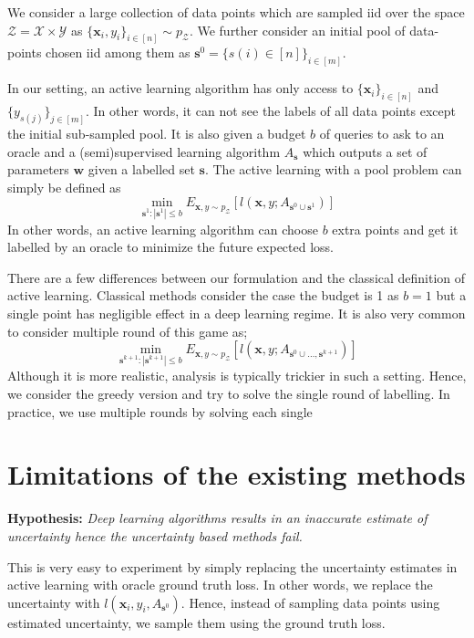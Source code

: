 \documentclass{article}
\begin{document}
We consider a large collection of data points which are sampled iid over the space  $\mathcal{Z}=\mathcal{X}\times\mathcal{Y}$ as \mbox{$\{\mathbf{x}_i,y_i\}_{i \in [n]} \sim p_\mathcal{Z}$}. We further consider an initial pool of data-points chosen iid among them as \mbox{$\mathbf{s}^0=\{s(i) \in [n]\}_{i \in [m]}$}. 

In our setting, an active learning algorithm has only access to $\{\mathbf{x}_i\}_{i \in [n]}$ and $\{y_{s(j)}\}_{j \in [m] }$. In other words, it can not see the labels of all data points except the initial sub-sampled pool. It is also given a budget $b$ of queries to ask to an oracle and a (semi)supervised learning algorithm $A_{\mathbf{s}}$ which outputs a set of parameters $\mathbf{w}$ given a labelled set $\mathbf{s}$. The active learning with a pool problem can simply be defined as
\begin{equation}
\min_{\mathbf{s}^1 : |\mathbf{s}^1| \leq b} E_{\mathbf{x},y \sim p_\mathcal{Z}} [l(\mathbf{x},y; A_{\mathbf{s}^0 \cup \mathbf{s}^1})]
\end{equation}
In other words, an active learning algorithm can choose $b$ extra points and get it labelled by an oracle to minimize the future expected loss.

There are a few differences between our formulation and the classical definition of active learning. Classical methods consider the case the budget is 1 as $b=1$ but a single point has negligible effect in a deep learning regime. It is also very common to consider multiple round of this game as;
\begin{equation}
\min_{\mathbf{s}^{k+1} : |\mathbf{s}^{k+1}| \leq b} E_{\mathbf{x},y \sim p_\mathcal{Z}} [l(\mathbf{x},y; A_{\mathbf{s}^{0} \cup \ldots, \mathbf{s}^{k+1}})]
\end{equation}
Although it is more realistic, analysis is typically trickier in such a setting. Hence, we consider the greedy version and try to solve the single round of labelling. In practice, we use multiple rounds by solving each single

\section{Limitations of the existing methods}
\noindent\textbf{Hypothesis:} \emph{Deep learning algorithms results in an inaccurate estimate of uncertainty hence the uncertainty based methods fail.}

This is very easy to experiment by simply replacing the uncertainty estimates in active learning with oracle ground truth loss. In other words, we replace the uncertainty with $l(\mathbf{x}_i,y_i,A_{\mathbf{s}^0})$. Hence, instead of sampling data points using estimated uncertainty, we sample them using the ground truth loss.
\end{document}
